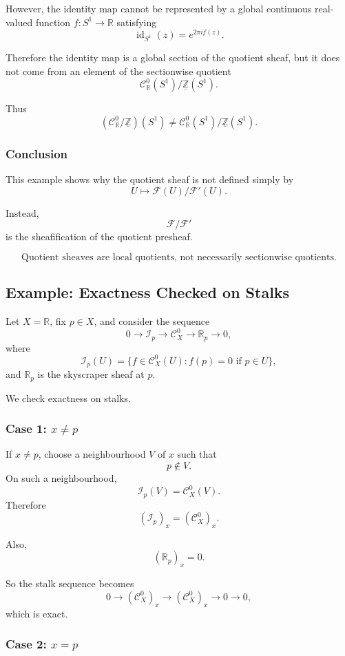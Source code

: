 \documentclass[12pt,a4paper]{article}
\DeclareMathOperator{\id}{id}
\newcommand{\F}{\mathcal F}
\newcommand{\RR}{\mathbb{R}}
\newcommand{\ZZ}{\mathbb{Z}}
\newcommand{\Czero}{\mathcal C^0}        %
\theoremstyle{notespace}
\newcommand{\Fp}{\mathcal F'}      %
\newcommand{\SSone}{S^1}
\begin{document}
However, the identity map cannot be represented by a global continuous real-valued function \(f:\SSone\to \RR\) satisfying
\[
\id_{\SSone}(z)=e^{2\pi i f(z)}.
\]

Therefore the identity map is a global section of the quotient sheaf, but it does not come from an element of the sectionwise quotient
\[
\Czero_{\RR}(\SSone)/\underline{\ZZ}(\SSone).
\]

Thus
\[
(\Czero_{\RR}/\underline{\ZZ})(\SSone)
\neq
\Czero_{\RR}(\SSone)/\underline{\ZZ}(\SSone).
\]

\subsubsection*{Conclusion}

This example shows why the quotient sheaf is not defined simply by
\[
U\mapsto \F(U)/\Fp(U).
\]

Instead,
\[
\F/\Fp
\]
is the sheafification of the quotient presheaf.

\[
\boxed{
	\text{Quotient sheaves are local quotients, not necessarily sectionwise quotients.}
}
\]

\subsection{Example: Exactness Checked on Stalks}

Let \(X=\RR\), fix \(p\in X\), and consider the sequence
\[
0\to \mathcal I_p
\to \Czero_X
\to \RR_p
\to 0,
\]
where
\[
\mathcal I_p(U)
=
\{f\in \Czero_X(U): f(p)=0 \text{ if }p\in U\},
\]
and \(\RR_p\) is the skyscraper sheaf at \(p\).

We check exactness on stalks.

\subsubsection*{Case 1: \(x\neq p\)}

If \(x\neq p\), choose a neighbourhood \(V\) of \(x\) such that
\[
p\notin V.
\]
On such a neighbourhood,
\[
\mathcal I_p(V)=\Czero_X(V).
\]
Therefore
\[
(\mathcal I_p)_x=(\Czero_X)_x.
\]

Also,
\[
(\RR_p)_x=0.
\]

So the stalk sequence becomes
\[
0\to (\Czero_X)_x
\to (\Czero_X)_x
\to 0
\to 0,
\]
which is exact.

\subsubsection*{Case 2: \(x=p\)}
\end{document}
